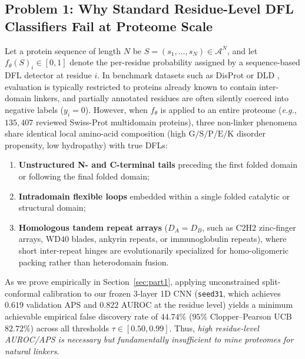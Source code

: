 \documentclass[11pt]{article}
\begin{document}
\subsection{Problem 1: Why Standard Residue-Level DFL Classifiers Fail at Proteome Scale}
Let a protein sequence of length $N$ be $S = (s_1, \dots, s_N) \in \mathcal{A}^N$, and let $f_\theta(S)_i \in [0, 1]$ denote the per-residue probability assigned by a sequence-based DFL detector at residue $i$. In benchmark datasets such as DisProt \cite{caid2_linker2024,caid3_2025} or DLD \cite{dld2026jmb}, evaluation is typically restricted to proteins already known to contain inter-domain linkers, and partially annotated residues are often silently coerced into negative labels ($y_i = 0$). However, when $f_\theta$ is applied to an entire proteome (\emph{e.g.}, $135{,}407$ reviewed Swiss-Prot multidomain proteins), three non-linker phenomena share identical local amino-acid composition (high $\text{G/S/P/E/K}$ disorder propensity, low hydropathy) with true DFLs:
\begin{enumerate}
  \item \textbf{Unstructured N- and C-terminal tails} preceding the first folded domain or following the final folded domain;
  \item \textbf{Intradomain flexible loops} embedded within a single folded catalytic or structural domain;
  \item \textbf{Homologous tandem repeat arrays} ($D_A = D_B$, such as $\text{C2H2}$ zinc-finger arrays, $\text{WD40}$ blades, ankyrin repeats, or immunoglobulin repeats), where short inter-repeat hinges are evolutionarily specialized for homo-oligomeric packing rather than heterodomain fusion.
\end{enumerate}
As we prove empirically in Section~\ref{sec:part1}, applying unconstrained split-conformal calibration \cite{bates2021rcps} to our frozen 3-layer 1D CNN (\texttt{seed31}, which achieves $0.619$ validation APS and $0.822$ AUROC at the residue level) yields a minimum achievable empirical false discovery rate of $44.74\%$ ($95\%$ Clopper--Pearson UCB $82.72\%$) across all thresholds $\tau \in [0.50, 0.99]$. Thus, \emph{high residue-level AUROC/APS is necessary but fundamentally insufficient to mine proteomes for natural linkers}.
\end{document}
